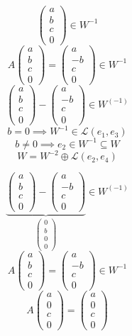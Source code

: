 \documentclass[a4paper]{article}
\theoremstyle{definition}
\begin{document}
\[ \begin{pmatrix} a \\ b \\ c \\ 0 \end{pmatrix} \in W^{-1} \]
\[ A \begin{pmatrix} a \\ b \\ c \\ 0 \end{pmatrix} = \begin{pmatrix} a \\ -b \\ c \\ 0 \end{pmatrix} \in W^{-1} \]
\[ \begin{pmatrix} a \\ b \\ c \\ 0 \end{pmatrix} - \begin{pmatrix} a \\ -b \\ c \\ 0 \end{pmatrix} \in W^{(-1)} \]
\[ b = 0 \implies W^{-1} \in \mathcal L(e_1, e_3) \]
\[ b \neq 0 \implies e_2 \in W^{-1} \subseteq W \]
\[ W = W^{-2} \oplus \mathcal L(e_2, e_4) \]

\[ \underbrace{\begin{pmatrix} a \\ b \\ c \\ 0 \end{pmatrix} - \begin{pmatrix} a \\ -b \\ c \\ 0 \end{pmatrix}}_{\begin{pmatrix} 0 \\ b \\ 0 \\ 0 \end{pmatrix}} \in W^{(-1)}  \]
\[ A \begin{pmatrix} a \\ b \\ c \\ 0 \end{pmatrix} = \begin{pmatrix} a \\ -b \\ c \\ 0 \end{pmatrix} \in W^{-1} \]
\[ A \begin{pmatrix} a \\ 0 \\ c \\ 0 \end{pmatrix} = \begin{pmatrix} a \\ 0 \\ c \\ 0 \end{pmatrix} \]
\end{document}
